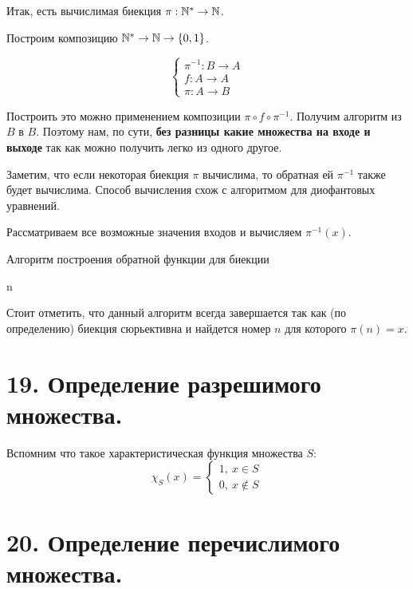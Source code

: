 Итак, есть вычислимая биекция $\pi: \mathbb{N}^* \to \mathbb{N}$.

Построим композицию $\mathbb{N}^* \to \mathbb{N} \to \{0, 1\}$.

\[
\begin{cases}
\pi^{-1}: B \to A \\
f: A \to A \\
\pi: A \to B
\end{cases}
\]

Построить это можно применением композиции  $\pi \circ f \circ \pi^{-1}$. Получим алгоритм из $B$ в $B$. 
Поэтому нам, по сути, \textbf{без разницы какие множества на входе
	и выходе} так как можно получить легко из одного другое.

Заметим, что если некоторая биекция $\pi$ вычислима, то обратная ей $\pi^{-1}$ также будет вычислима. Способ вычисления схож с алгоритмом для диофантовых уравнений.

Рассматриваем все возможные значения входов и вычисляем $\pi^{-1}(x)$.
\begin{algorithm}
	\caption{Алгоритм построения обратной функции для биекции}
	\begin{algorithmic}[1]
		\State \Return n
		\EndIf
		\EndFor
		\EndFunction
	\end{algorithmic}
\end{algorithm}

Стоит отметить, что данный алгоритм всегда завершается так как
(по определению) биекция сюрьективна и найдется номер $n$ для
которого $\pi(n) = x$.


\section*{19. Определение разрешимого множества.}

Вспомним что такое характеристическая функция множества $S$:
\[
\chi_S(x) = \begin{cases}
1,\ x \in S \\
0,\ x \notin S
\end{cases}
\]


\section*{20. Определение перечислимого множества.}

